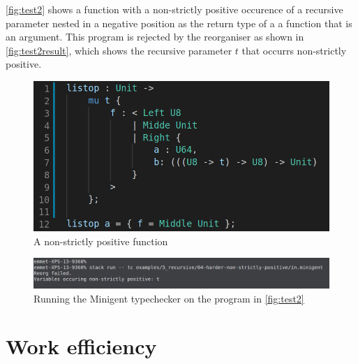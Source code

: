 \autoref{fig:test2} shows a function with a non-strictly positive occurence of a recursive parameter nested in 
a negative position as the return type of a a function that is an argument. This program is rejected by the reorganiser
as shown in \autoref{fig:test2result}, which shows the recursive parameter $t$ that occurrs non-strictly positive.

\begin{figure}
    \centering
    \includegraphics[width=0.8\linewidth]{content/test2.png}
    \caption{A non-strictly positive function}
    \label{fig:test2}
\end{figure}

\begin{figure}
    \centering
    \includegraphics[width=\linewidth]{content/test2result.png}
    \caption{Running the Minigent typechecker on the program in \autoref{fig:test2}}
    \label{fig:test2result}
\end{figure}

\section{Work efficiency}

